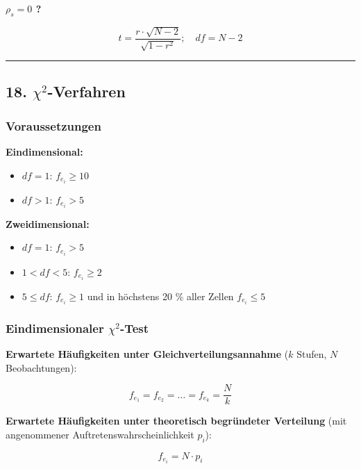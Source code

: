 \documentclass[
]{article}
\providecommand{\tightlist}{%
  \setlength{\itemsep}{0pt}\setlength{\parskip}{0pt}}
\begin{document}
\textbf{\(\rho_s = 0\) ?}

\[t = \frac{r \cdot \sqrt{N - 2}}{\sqrt{1 - r^2}}; \quad df = N - 2\]

\begin{center}\rule{0.5\linewidth}{0.5pt}\end{center}

\subsection{\texorpdfstring{18.
\(\chi^2\)-Verfahren}{18. \textbackslash chi\^{}2-Verfahren}}\label{chi2-verfahren}

\subsubsection{Voraussetzungen}\label{voraussetzungen}

\textbf{Eindimensional:}

\begin{itemize}
\tightlist
\item
  \(df = 1\): \(f_{e_i} \geq 10\)
\item
  \(df > 1\): \(f_{e_i} > 5\)
\end{itemize}

\textbf{Zweidimensional:}

\begin{itemize}
\tightlist
\item
  \(df = 1\): \(f_{e_i} > 5\)
\item
  \(1 < df < 5\): \(f_{e_i} \geq 2\)
\item
  \(5 \leq df\): \(f_{e_i} \geq 1\) und in höchstens 20 \% aller Zellen
  \(f_{e_i} \leq 5\)
\end{itemize}

\subsubsection{\texorpdfstring{Eindimensionaler
\(\chi^2\)-Test}{Eindimensionaler \textbackslash chi\^{}2-Test}}\label{eindimensionaler-chi2-test}

\textbf{Erwartete Häufigkeiten unter Gleichverteilungsannahme} (\(k\)
Stufen, \(N\) Beobachtungen):

\[f_{e_1} = f_{e_2} = \dots = f_{e_k} = \frac{N}{k}\]

\textbf{Erwartete Häufigkeiten unter theoretisch begründeter Verteilung}
(mit angenommener Auftretenswahrscheinlichkeit \(p_i\)):

\[f_{e_i} = N \cdot p_i\]
\end{document}
